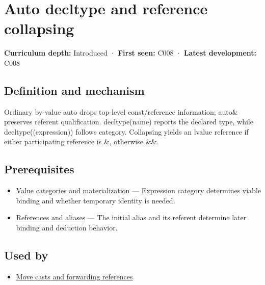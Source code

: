 \hypertarget{appendix-5d4252a42886}{}\label{referencestart:appendix-5d4252a42886}
\section{Auto decltype and reference collapsing}\label{appendix-5d4252a42886-auto-decltype-and-reference-collapsing}

\textbf{Curriculum depth:} Introduced · \textbf{First seen:} C008 · \textbf{Latest development:} C008

\begin{allmightroledefinition}

\subsection{Definition and mechanism}\label{appendix-5d4252a42886-definition-and-mechanism}

Ordinary by-value auto drops top-level const/reference information; auto\& preserves referent qualification. decltype(name) reports the declared type, while decltype((expression)) follows category. Collapsing yields an lvalue reference if either participating reference is \&, otherwise \&\&.

\end{allmightroledefinition}

\subsection{Prerequisites}\label{appendix-5d4252a42886-prerequisites}

\begin{itemize}
\tightlist
\item
  \hyperref[appendix-1121b30eaeb0]{Value categories and materialization} --- Expression category determines viable binding and whether temporary identity is needed.
\item
  \hyperref[appendix-d6d562ca9fbb]{References and aliases} --- The initial alias and its referent determine later binding and deduction behavior.
\end{itemize}

\subsection{Used by}\label{appendix-5d4252a42886-used-by}

\begin{itemize}
\tightlist
\item
  \hyperref[appendix-0104b704fb11]{Move casts and forwarding references}
\end{itemize}

